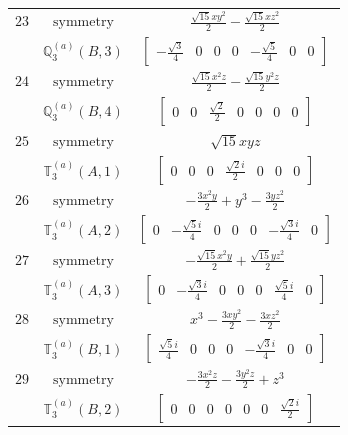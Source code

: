 \documentclass[fleqn,8pt,landscape]{jsarticle}
\begin{document}
\begin{longtable}{ccc}
$ 23 $ & $ \text{symmetry} $ & $ \frac{\sqrt{15} x y^{2}}{2} - \frac{\sqrt{15} x z^{2}}{2} $ \\
$  $ & $ \mathbb{Q}_{3}^{(a)}(B,3) $ & $ \begin{bmatrix} - \frac{\sqrt{3}}{4} & 0 & 0 & 0 & - \frac{\sqrt{5}}{4} & 0 & 0 \end{bmatrix} $ \\ \hline
$ 24 $ & $ \text{symmetry} $ & $ \frac{\sqrt{15} x^{2} z}{2} - \frac{\sqrt{15} y^{2} z}{2} $ \\
$  $ & $ \mathbb{Q}_{3}^{(a)}(B,4) $ & $ \begin{bmatrix} 0 & 0 & \frac{\sqrt{2}}{2} & 0 & 0 & 0 & 0 \end{bmatrix} $ \\ \hline
$ 25 $ & $ \text{symmetry} $ & $ \sqrt{15} x y z $ \\
$  $ & $ \mathbb{T}_{3}^{(a)}(A,1) $ & $ \begin{bmatrix} 0 & 0 & 0 & \frac{\sqrt{2} i}{2} & 0 & 0 & 0 \end{bmatrix} $ \\ \hline
$ 26 $ & $ \text{symmetry} $ & $ - \frac{3 x^{2} y}{2} + y^{3} - \frac{3 y z^{2}}{2} $ \\
$  $ & $ \mathbb{T}_{3}^{(a)}(A,2) $ & $ \begin{bmatrix} 0 & - \frac{\sqrt{5} i}{4} & 0 & 0 & 0 & - \frac{\sqrt{3} i}{4} & 0 \end{bmatrix} $ \\ \hline
$ 27 $ & $ \text{symmetry} $ & $ - \frac{\sqrt{15} x^{2} y}{2} + \frac{\sqrt{15} y z^{2}}{2} $ \\
$  $ & $ \mathbb{T}_{3}^{(a)}(A,3) $ & $ \begin{bmatrix} 0 & - \frac{\sqrt{3} i}{4} & 0 & 0 & 0 & \frac{\sqrt{5} i}{4} & 0 \end{bmatrix} $ \\ \hline
$ 28 $ & $ \text{symmetry} $ & $ x^{3} - \frac{3 x y^{2}}{2} - \frac{3 x z^{2}}{2} $ \\
$  $ & $ \mathbb{T}_{3}^{(a)}(B,1) $ & $ \begin{bmatrix} \frac{\sqrt{5} i}{4} & 0 & 0 & 0 & - \frac{\sqrt{3} i}{4} & 0 & 0 \end{bmatrix} $ \\ \hline
$ 29 $ & $ \text{symmetry} $ & $ - \frac{3 x^{2} z}{2} - \frac{3 y^{2} z}{2} + z^{3} $ \\
$  $ & $ \mathbb{T}_{3}^{(a)}(B,2) $ & $ \begin{bmatrix} 0 & 0 & 0 & 0 & 0 & 0 & \frac{\sqrt{2} i}{2} \end{bmatrix} $ \\ \hline

\end{longtable}
\end{document}
